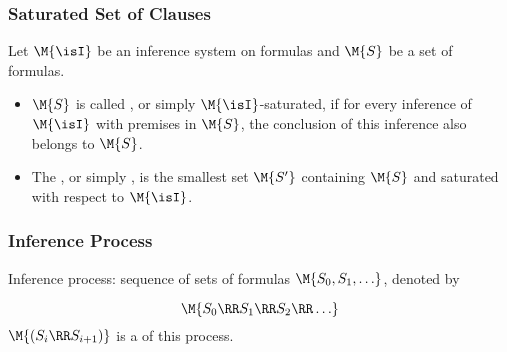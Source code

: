 
	   \begin{frame}\frametitle{Saturated Set of Clauses}

  Let $\M{\isI}$ be an inference system on formulas and $\M{S}$ be a set of 
  formulas. 

\begin{itemize}
\item
$\M{S}$ is called ,
  or simply \alert{$\M{\isI}$-saturated},
  if for every inference of $\M{\isI}$ with premises in $\M{S}$, the conclusion
  of this inference also belongs to $\M{S}$.

\item 
The ,
  or simply ,
  is the smallest set $\M{S'}$ containing $\M{S}$ and saturated with respect to
  $\M{\isI}$.
\end{itemize}

\end{frame}


	   \begin{frame}\frametitle{Inference Process}

  \alert{Inference process:} sequence
  of sets of formulas $\M{S_0,S_1,\ldots}$, denoted by 

    \[
      \M{S_0 \RR S_1 \RR S_2 \RR \ldots}
    \]
  $\M{(S_i \RR S_{i+1})}$ is a  of this 
  process. 

\medskip


\medskip


                           \end{frame}

